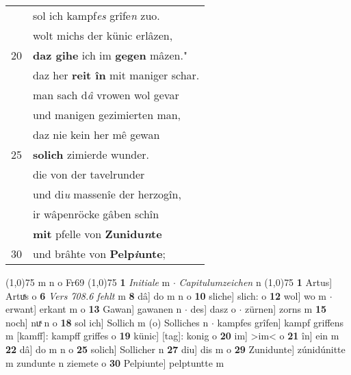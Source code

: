 \documentclass[8pt,a4paper,notitlepage]{article}
\begin{document}
\begin{table}[ht]
\begin{minipage}[t]{0.5\linewidth}
\begin{tabular}{rl}
 & sol ich kampf\textit{es} grîfe\textit{n} zuo.\\ 
 & wolt michs der künic erlâzen,\\ 
20 & \textbf{daz gihe} ich im \textbf{gegen} mâzen."\\ 
 & daz her \textbf{reit în} mit maniger schar.\\ 
 & man sach d\textit{â} vrowen wol gevar\\ 
 & und manigen gezimierten man,\\ 
 & daz nie kein her mê gewan\\ 
25 & \textbf{solich} zimierde wunder.\\ 
 & die von der tavelrunder\\ 
 & und di\textit{u} massenîe der herzogîn,\\ 
 & ir wâpenröcke gâben schîn\\ 
 & \textbf{mit} pfelle von \textbf{Zunidu\textit{n}te}\\ 
30 & und brâhte von \textbf{Pelp\textit{i}unte};\\ 
\end{tabular}
\scriptsize
\line(1,0){75} \newline
m n o Fr69 \newline
\line(1,0){75} \newline
\textbf{1} \textit{Initiale} m   $\cdot$ \textit{Capitulumzeichen} n  \newline
\line(1,0){75} \newline
\textbf{1} Artus] Artuͯs o \textbf{6} \textit{Vers 708.6 fehlt} m  \textbf{8} dâ] do m n o \textbf{10} sliche] slich: o \textbf{12} wol] wo m  $\cdot$ erwant] erkant m o \textbf{13} Gawan] gawanen n  $\cdot$ des] dasz o  $\cdot$ zürnen] zorns m \textbf{15} noch] nuͯ n o \textbf{18} sol ich] Sollich m (o) Solliches n  $\cdot$ kampfes grîfen] kampf griffens m [kamff]: kampff griffes o \textbf{19} künic] [tag]: konig o \textbf{20} im] >im< o \textbf{21} în] ein m \textbf{22} dâ] do m n o \textbf{25} solich] Sollicher n \textbf{27} diu] dis m o \textbf{29} Zunidunte] zúnidúnitte m zundunte n ziemete o \textbf{30} Pelpiunte] pelptuntte m \newline
\end{minipage}
\end{table}
\newpage
\end{document}
